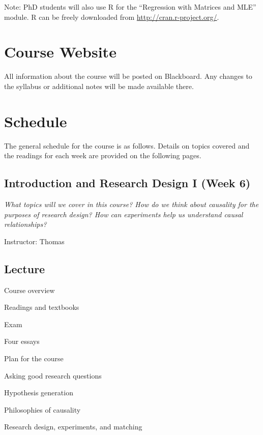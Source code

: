 \documentclass[11pt,a4paper]{article}
\newcommand{\thomas}{\vspace{1em}\noindent Instructor: Thomas\\}
\begin{document}
Note: PhD students will also use R for the ``Regression with Matrices and MLE'' module. R can be freely downloaded from \href{http://cran.r-project.org/}{http://cran.r-project.org/}.

\section{Course Website}
All information about the course will be posted on Blackboard. Any changes to the syllabus or additional notes will be made available there.





\clearpage
\section{Schedule}
The general schedule for the course is as follows. Details on topics covered and the readings for each week are provided on the following pages.

\secttoc

\clearpage

\subsection{Introduction and Research Design I (Week 6)}
\emph{What topics will we cover in this course? How do we think about causality for the purposes of research design? How can experiments help us understand causal relationships?}

\thomas

\subsection*{Lecture}

\begin{itemize*}
\item Course overview
    \begin{itemize*}
    \item Readings and textbooks
    \item Exam
    \item Four essays
    \item Plan for the course
    \end{itemize*}
\item Asking good research questions
\item Hypothesis generation
\item Philosophies of causality
\item Research design, experiments, and matching
\end{itemize*}
\end{document}
